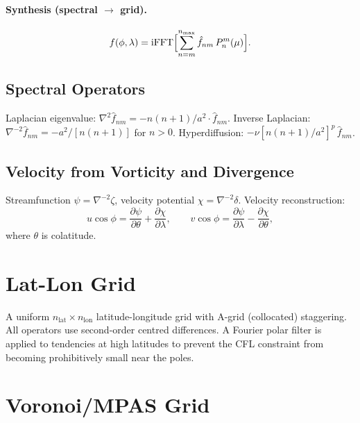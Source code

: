 \documentclass[11pt,twoside]{report}
\newcommand{\pp}{\partial}
\begin{document}
\paragraph{Synthesis (spectral $\to$ grid).}
\begin{equation}
  f(\phi,\lambda) = \mathrm{iFFT}\Bigl[\sum_{n=m}^{n_{\max}}\hat f_{nm}\,P_n^m(\mu)\Bigr].
\end{equation}

\subsection{Spectral Operators}

Laplacian eigenvalue:
$\nabla^2\hat f_{nm}=-n(n+1)/a^2\cdot\hat f_{nm}$.
Inverse Laplacian:
$\nabla^{-2}\hat f_{nm}=-a^2/[n(n+1)]$ for $n>0$.
Hyperdiffusion:
$-\nu[n(n+1)/a^2]^p\,\hat f_{nm}$.

\subsection{Velocity from Vorticity and Divergence}

Streamfunction $\psi=\nabla^{-2}\zeta$, velocity potential
$\chi=\nabla^{-2}\delta$.  Velocity reconstruction:
\begin{equation}
  u\cos\phi = \frac{\pp\psi}{\pp\theta}+\frac{\pp\chi}{\pp\lambda},
  \qquad
  v\cos\phi = \frac{\pp\psi}{\pp\lambda}-\frac{\pp\chi}{\pp\theta},
\end{equation}
where $\theta$ is colatitude.


\section{Lat-Lon Grid}
\label{sec:latlon-grid}

A uniform $n_{\mathrm{lat}}\times n_{\mathrm{lon}}$ latitude-longitude grid
with A-grid (collocated) staggering.  All operators use second-order centred
differences.  A Fourier polar filter is applied to tendencies at high
latitudes to prevent the CFL constraint from becoming prohibitively small
near the poles.


\section{Voronoi/MPAS Grid}
\label{sec:voronoi-grid}
\end{document}
